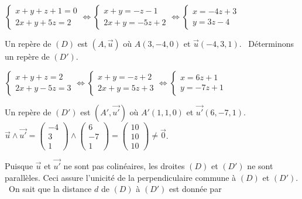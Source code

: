 \documentclass[11pt,a4paper]{article}
\begin{document}
\begin{center}
$\left\{
\begin{array}{l}
x+y+z+1=0\\
2x+y+5z=2
\end{array}
\right.\Leftrightarrow\left\{
\begin{array}{l}
x+y=-z-1\\
2x+y=-5z+2
\end{array}
\right.\Leftrightarrow\left\{
\begin{array}{l}
x=-4z+3\\
y=3z-4
\end{array}
\right.$
\end{center}
Un repère de $(D)$ est $\left(A,\overrightarrow{u}\right)$ où $A(3,-4,0)$ et $\overrightarrow{u}(-4,3,1)$.
\textbullet~Déterminons un repère de $(D')$.

\begin{center}
$\left\{
\begin{array}{l}
x+y+z=2\\
2x+y-5z=3
\end{array}
\right.\Leftrightarrow\left\{
\begin{array}{l}
x+y=-z+2\\
2x+y=5z+3
\end{array}
\right.\Leftrightarrow\left\{
\begin{array}{l}
x=6z+1\\
y=-7z+1
\end{array}
\right.$
\end{center}
Un repère de $(D')$ est $\left(A',\overrightarrow{u'}\right)$ où $A'(1,1,0)$ et $\overrightarrow{u'}(6,-7,1)$.
\textbullet~$\overrightarrow{u}\wedge\overrightarrow{u'}=\left(
\begin{array}{c}
-4\\
3\\
1
\end{array}
\right)\wedge\left(
\begin{array}{c}
6\\
-7\\
1
\end{array}
\right)=\left(
\begin{array}{c}
10\\
10\\
10
\end{array}
\right)\neq\overrightarrow{0}$.
\rule{0mm}{5mm}Puisque $\overrightarrow{u}$ et $\overrightarrow{u'}$ ne sont pas colinéaires, les droites $(D)$ et $(D')$ ne sont parallèles. Ceci assure l'unicité de la perpendiculaire commune  à $(D)$ et $(D')$.
\textbullet~On sait que la distance $d$ de $(D)$ à $(D')$ est donnée par
\end{document}
